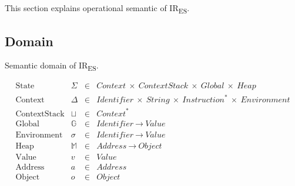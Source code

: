 \documentclass[11pt]{article}
\newcommand{\irname}[0]{IR\textsubscript{ES}\xspace}
\newcommand{\symstate}[0]{\Sigma}
\newcommand{\symctx}[0]{\Delta}
\newcommand{\symctxstack}[0]{\sqcup}
\newcommand{\symglb}[0]{\mathbb{G}}
\newcommand{\symenv}[0]{\sigma}
\newcommand{\symheap}[0]{\mathbb{M}}
\begin{document}
This section explains operational semantic of \irname.

\subsection{Domain}

Semantic domain of \irname.

\[
\begin{array}{rrrl}
\text{State} & \symstate & \in &
\textit{Context}\ \times\ \textit{ContextStack}\
\times\ \textit{Global}\ \times\ \textit{Heap}
\\
\text{Context} & \symctx & \in &
\textit{Identifier}\ \times\ \textit{String}\
\times\ \textit{Instruction}^*\ \times\ \textit{Environment}
\\
\text{ContextStack} & \symctxstack & \in & \textit{Context}^*
\\
\text{Global} & \symglb & \in &
\textit{Identifier}\ \to\ \textit{Value}
\\
\text{Environment} & \symenv & \in &
\textit{Identifier}\ \to\ \textit{Value}
\\
\text{Heap} & \symheap & \in &
\textit{Address}\ \to\ \textit{Object}
\\
\text{Value} & v & \in & \textit{Value}
\\
\text{Address} & a & \in & \textit{Address}
\\
\text{Object} & o & \in & \textit{Object}
\\

\end{array}
\]
\end{document}
